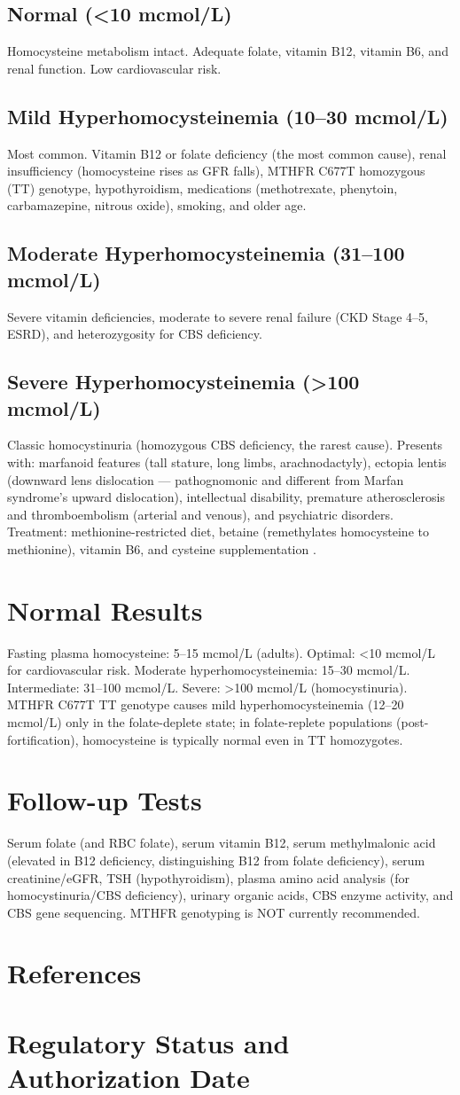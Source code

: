 \subsection*{Normal (<10 mcmol/L)}
Homocysteine metabolism intact. Adequate folate, vitamin B12, vitamin B6, and renal function. Low cardiovascular risk.
\subsection*{Mild Hyperhomocysteinemia (10--30 mcmol/L)}
Most common. Vitamin B12 or folate deficiency (the most common cause), renal insufficiency (homocysteine rises as GFR falls), MTHFR C677T homozygous (TT) genotype, hypothyroidism, medications (methotrexate, phenytoin, carbamazepine, nitrous oxide), smoking, and older age.
\subsection*{Moderate Hyperhomocysteinemia (31--100 mcmol/L)}
Severe vitamin deficiencies, moderate to severe renal failure (CKD Stage 4--5, ESRD), and heterozygosity for CBS deficiency.
\subsection*{Severe Hyperhomocysteinemia (>100 mcmol/L)}
Classic homocystinuria (homozygous CBS deficiency, the rarest cause). Presents with: marfanoid features (tall stature, long limbs, arachnodactyly), ectopia lentis (downward lens dislocation --- pathognomonic and different from Marfan syndrome's upward dislocation), intellectual disability, premature atherosclerosis and thromboembolism (arterial and venous), and psychiatric disorders. Treatment: methionine-restricted diet, betaine (remethylates homocysteine to methionine), vitamin B6, and cysteine supplementation \cite{mudd1985natural}.
\section*{Normal Results}
Fasting plasma homocysteine: 5--15 mcmol/L (adults). Optimal: <10 mcmol/L for cardiovascular risk. Moderate hyperhomocysteinemia: 15--30 mcmol/L. Intermediate: 31--100 mcmol/L. Severe: >100 mcmol/L (homocystinuria). MTHFR C677T TT genotype causes mild hyperhomocysteinemia (12--20 mcmol/L) only in the folate-deplete state; in folate-replete populations (post-fortification), homocysteine is typically normal even in TT homozygotes.
\section*{Follow-up Tests}
Serum folate (and RBC folate), serum vitamin B12, serum methylmalonic acid (elevated in B12 deficiency, distinguishing B12 from folate deficiency), serum creatinine/eGFR, TSH (hypothyroidism), plasma amino acid analysis (for homocystinuria/CBS deficiency), urinary organic acids, CBS enzyme activity, and CBS gene sequencing. MTHFR genotyping is NOT currently recommended.
\section*{References}


\clearpage
\section*{Regulatory Status and Authorization Date}

\clearpage
